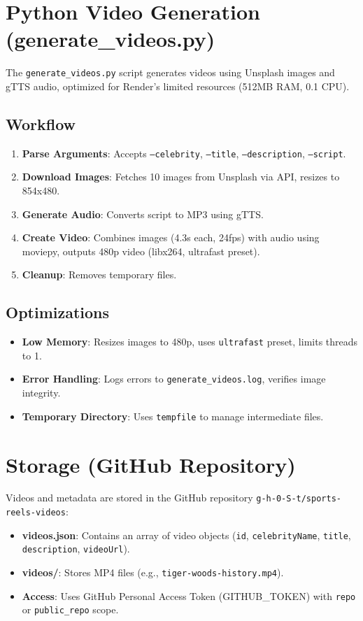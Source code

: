 \documentclass[a4paper,12pt]{article}
\begin{document}
\section{Python Video Generation (generate\_videos.py)}
The \texttt{generate\_videos.py} script generates videos using Unsplash images and gTTS audio, optimized for Render's limited resources (512MB RAM, 0.1 CPU).

\subsection{Workflow}
\begin{enumerate}
    \item \textbf{Parse Arguments}: Accepts \texttt{--celebrity}, \texttt{--title}, \texttt{--description}, \texttt{--script}.
    \item \textbf{Download Images}: Fetches 10 images from Unsplash via API, resizes to 854x480.
    \item \textbf{Generate Audio}: Converts script to MP3 using gTTS.
    \item \textbf{Create Video}: Combines images (4.3s each, 24fps) with audio using moviepy, outputs 480p video (libx264, ultrafast preset).
    \item \textbf{Cleanup}: Removes temporary files.
\end{enumerate}

\subsection{Optimizations}
\begin{itemize}
    \item \textbf{Low Memory}: Resizes images to 480p, uses \texttt{ultrafast} preset, limits threads to 1.
    \item \textbf{Error Handling}: Logs errors to \texttt{generate\_videos.log}, verifies image integrity.
    \item \textbf{Temporary Directory}: Uses \texttt{tempfile} to manage intermediate files.
\end{itemize}

\section{Storage (GitHub Repository)}
Videos and metadata are stored in the GitHub repository \texttt{g-h-0-S-t/sports-reels-videos}:
\begin{itemize}
    \item \textbf{videos.json}: Contains an array of video objects (\texttt{id}, \texttt{celebrityName}, \texttt{title}, \texttt{description}, \texttt{videoUrl}).
    \item \textbf{videos/}: Stores MP4 files (e.g., \texttt{tiger-woods-history.mp4}).
    \item \textbf{Access}: Uses GitHub Personal Access Token (GITHUB\_TOKEN) with \texttt{repo} or \texttt{public\_repo} scope.
\end{itemize}
\end{document}
